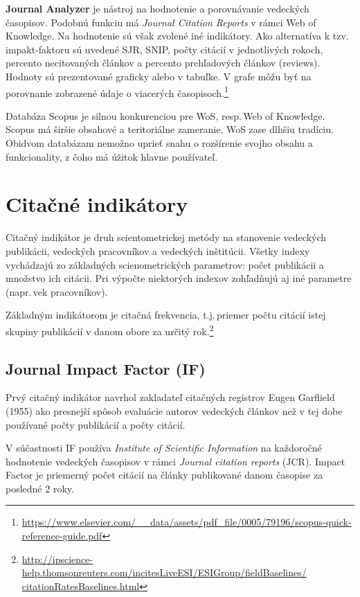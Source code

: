 \textbf{Journal Analyzer} je nástroj na hodnotenie a porovnávanie vedeckých
časopisov.  Podobnú funkciu má \emph{Journal Citation Reports} v rámci Web of
Knowledge.  Na hodnotenie sú však zvolené iné indikátory.  Ako alternatíva k
tzv.\,impakt-faktoru sú uvedené SJR, SNIP, počty citácií v jednotlivých rokoch,
percento necitovaných článkov a percento prehľadových článkov (reviews).
Hodnoty sú prezentované graficky alebo v tabuľke.  V grafe môžu byť na
porovnanie zobrazené údaje o viacerých
časopisoch.\footnote{\url{https://www.elsevier.com/__data/assets/pdf_file/0005/79196/scopus-quick-reference-guide.pdf}}

Databáza Scopus je silnou konkurenciou pre WoS, resp.\,Web of Knowledge.  Scopus
má širšie obsahové a teritoriálne zameranie, WoS zase dlhšiu tradíciu.  Obidvom
databázam nemožno uprieť snahu o rozšírenie svojho obsahu a funkcionality, z
čoho má úžitok hlavne používateľ.


\section{Citačné indikátory}
\label{sec:citation.indicators}

Citačný indikátor je druh scientometrickej metódy na stanovenie 
vedeckých publikácii, vedeckých pracovníkov a vedeckých inštitúcii.  Všetky
indexy vychádzajú zo základných scienometrických parametrov: počet publikácii a
množstvo ich citácii.  Pri výpočte niektorých indexov zohľadňujú aj iné
parametre (napr.\,vek pracovníkov).

Základným indikátorom je citačná frekvencia, t.j.\,priemer počtu citácií istej
skupiny publikácií v danom obore za určitý
rok.\footnote{\url{http://ipscience-help.thomsonreuters.com/incitesLiveESI/ESIGroup/fieldBaselines/
    citationRatesBaselines.html}}


\subsection{Journal Impact Factor (IF)}

Prvý citačný indikátor navrhol zakladateľ citačných registrov Eugen Garflield
(1955) ako presnejší spôsob evaluácie autorov vedeckých článkov než v tej dobe
používané počty publikácií a počty citácií.

V súčastnosti IF používa \emph{Institute of Scientific Information} na
každoročné hodnotenie vedeckých časopisov v rámci \emph{Journal citation
  reports} (JCR).  Impact Factor je priemerný počet citácií na články
publikované danom časopise za posledné 2 roky.

